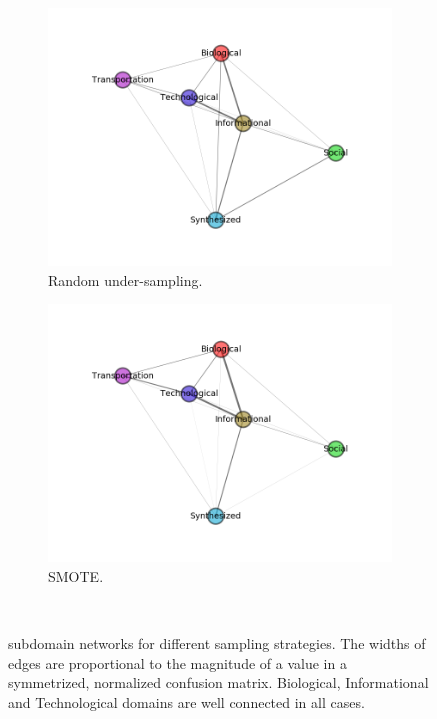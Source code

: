 \documentclass{article}
\begin{document}
\begin{figure}[H]
\medskip
\begin{subfigure}{0.48\textwidth}
\includegraphics[width=\linewidth]{figs/similarity/Domain/RandomUnder_26/g.png}
\caption{Random under-sampling.} \label{random_under_graph}
\end{subfigure}\hspace*{\fill}
\begin{subfigure}{0.48\textwidth}
\includegraphics[width=\linewidth]{figs/similarity/Domain/SMOTE/g.png}
\caption{SMOTE.} \label{smote_graph}
\end{subfigure}
\
\caption{subdomain networks for different sampling strategies. The widths of edges are proportional to the magnitude of a value in a symmetrized, normalized confusion matrix. Biological, Informational and Technological domains are well connected in all cases.} \label{meta_network}
\end{figure}
\end{document}
